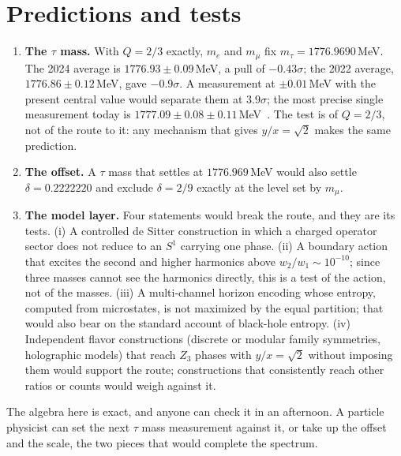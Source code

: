 \section{Predictions and tests}\label{sec:ko:tests}
\begin{enumerate}
\item \textbf{The $\tau$ mass.} With $Q=2/3$ exactly, $m_e$ and $m_\mu$ fix $m_\tau=1776.9690$\,MeV. The 2024 average is $1776.93\pm0.09$\,MeV, a
pull of $-0.43\sigma$; the 2022 average, $1776.86\pm0.12$\,MeV, gave $-0.9\sigma$. \calc{} A measurement at $\pm0.01$\,MeV with the present
central value would separate them at $3.9\sigma$; the most precise single measurement today is $1777.09\pm0.08\pm0.11$\,MeV~\cite{BelleII2023tau}.
\prediction{} The test is of $Q=2/3$, not of the route to it: any mechanism that gives $y/x=\sqrt2$ makes the same prediction.
\item \textbf{The offset.} A $\tau$ mass that settles at $1776.969$\,MeV would also settle $\delta=0.2222220$ and exclude $\delta=2/9$ exactly at
the level set by $m_\mu$. \calc
\item \textbf{The model layer.} Four statements would break the route, and they are its tests. (i) A controlled de Sitter construction in which a
charged operator sector does not reduce to an $S^1$ carrying one phase. (ii) A boundary action that excites the second and higher harmonics
above $w_2/w_1\sim10^{-10}$; since three masses cannot see the harmonics directly, this is a test of the action, not of the masses. (iii) A
multi-channel horizon encoding whose entropy, computed from microstates, is not maximized by the equal partition; that would also bear on the
standard account of black-hole entropy. (iv) Independent flavor constructions (discrete or modular family symmetries, holographic models)
that reach $Z_3$ phases with $y/x=\sqrt2$ without imposing them would support the route; constructions that consistently reach other ratios or
counts would weigh against it. \openprob
\end{enumerate}

The algebra here is exact, and anyone can check it in an afternoon. A particle physicist can set the next $\tau$ mass measurement against it, or take up the offset and the scale, the two pieces that would complete the spectrum.

